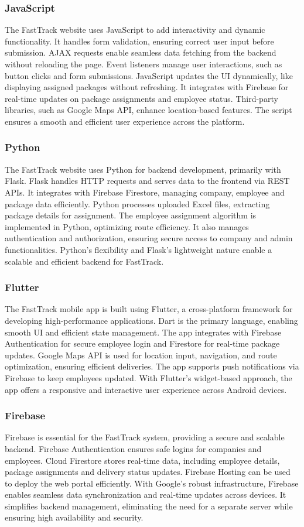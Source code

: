 \subsubsection{JavaScript}
The FastTrack website uses JavaScript to add interactivity and dynamic functionality. It handles form validation, ensuring correct user input before submission. AJAX requests enable seamless data fetching from the backend without reloading the page. Event listeners manage user interactions, such as button clicks and form submissions. JavaScript updates the UI dynamically, like displaying assigned packages without refreshing. It integrates with Firebase for real-time updates on package assignments and employee status. Third-party libraries, such as Google Maps API, enhance location-based features. The script ensures a smooth and efficient user experience across the platform.
\subsubsection{Python}
The FastTrack website uses Python for backend development, primarily with Flask. Flask handles HTTP requests and serves data to the frontend via REST APIs. It integrates with Firebase Firestore, managing company, employee and package data efficiently. Python processes uploaded Excel files, extracting package details for assignment. The employee assignment algorithm is implemented in Python, optimizing route efficiency. It also manages authentication and authorization, ensuring secure access to company and admin functionalities. Python’s flexibility and Flask’s lightweight nature enable a scalable and efficient backend for FastTrack.
\subsubsection{Flutter}
The FastTrack mobile app is built using Flutter, a cross-platform framework for developing high-performance applications. Dart is the primary language, enabling smooth UI and efficient state management. The app integrates with Firebase Authentication for secure employee login and Firestore for real-time package updates. Google Maps API is used for location input, navigation, and route optimization, ensuring efficient deliveries. The app supports push notifications via Firebase to keep employees updated. With Flutter's widget-based approach, the app offers a responsive and interactive user experience across Android devices.
\subsubsection{Firebase}
Firebase is essential for the FastTrack system, providing a secure and scalable backend. Firebase Authentication ensures safe logins for companies and employees. Cloud Firestore stores real-time data, including employee details, package assignments and delivery status updates. Firebase Hosting can be used to deploy the web portal efficiently. With Google’s robust infrastructure, Firebase enables seamless data synchronization and real-time updates across devices. It simplifies backend management, eliminating the need for a separate server while ensuring high availability and security.
